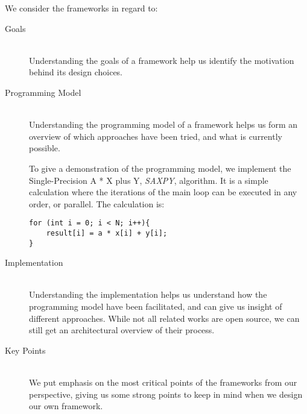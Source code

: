 We consider the frameworks in regard to:
\begin{description}
\item[Goals] \hfill \\
Understanding the goals of a framework help us identify the motivation behind its design choices.

\item[Programming Model] \hfill \\
Understanding the programming model of a framework helps us form an overview of which approaches have been tried, and what is currently possible. 

To give a demonstration of the programming model, we implement the Single-Precision A * X plus Y, \textit{SAXPY}, algorithm. It is a simple calculation where the iterations of the main loop can be executed in any order, or parallel. The calculation is:
\begin{lstlisting}
for (int i = 0; i < N; i++){
    result[i] = a * x[i] + y[i];
}
\end{lstlisting}

\item[Implementation] \hfill \\
Understanding the implementation helps us understand how the programming model have been facilitated, and can give us insight of different approaches. While not all related works are open source, we can still get an architectural overview of their process.

\item[Key Points] \hfill \\
We put emphasis on the most critical points of the frameworks from our perspective, giving us some strong points to keep in mind when we design our own framework.
\end{description}